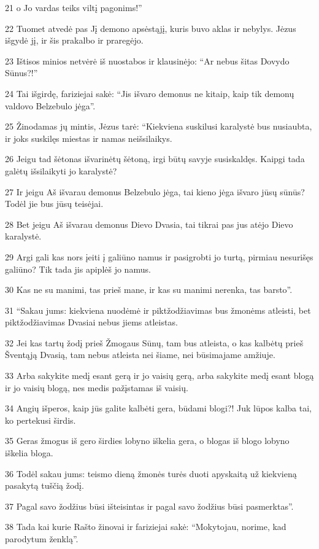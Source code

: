\par 21 o Jo vardas teiks viltį pagonims!” 
\par 22 Tuomet atvedė pas Jį demono apsėstąjį, kuris buvo aklas ir nebylys. Jėzus išgydė jį, ir šis prakalbo ir praregėjo. 
\par 23 Ištisos minios netvėrė iš nuostabos ir klausinėjo: “Ar nebus šitas Dovydo Sūnus?!” 
\par 24 Tai išgirdę, fariziejai sakė: “Jis išvaro demonus ne kitaip, kaip tik demonų valdovo Belzebulo jėga”. 
\par 25 Žinodamas jų mintis, Jėzus tarė: “Kiekviena suskilusi karalystė bus nusiaubta, ir joks suskilęs miestas ir namas neišsilaikys. 
\par 26 Jeigu tad šėtonas išvarinėtų šėtoną, irgi būtų savyje susiskaldęs. Kaipgi tada galėtų išsilaikyti jo karalystė? 
\par 27 Ir jeigu Aš išvarau demonus Belzebulo jėga, tai kieno jėga išvaro jūsų sūnūs? Todėl jie bus jūsų teisėjai. 
\par 28 Bet jeigu Aš išvarau demonus Dievo Dvasia, tai tikrai pas jus atėjo Dievo karalystė. 
\par 29 Argi gali kas nors įeiti į galiūno namus ir pasigrobti jo turtą, pirmiau nesurišęs galiūno? Tik tada jis apiplėš jo namus. 
\par 30 Kas ne su manimi, tas prieš mane, ir kas su manimi nerenka, tas barsto”. 
\par 31 “Sakau jums: kiekviena nuodėmė ir piktžodžiavimas bus žmonėms atleisti, bet piktžodžiavimas Dvasiai nebus jiems atleistas. 
\par 32 Jei kas tartų žodį prieš Žmogaus Sūnų, tam bus atleista, o kas kalbėtų prieš Šventąją Dvasią, tam nebus atleista nei šiame, nei būsimajame amžiuje. 
\par 33 Arba sakykite medį esant gerą ir jo vaisių gerą, arba sakykite medį esant blogą ir jo vaisių blogą, nes medis pažįstamas iš vaisių. 
\par 34 Angių išperos, kaip jūs galite kalbėti gera, būdami blogi?! Juk lūpos kalba tai, ko pertekusi širdis. 
\par 35 Geras žmogus iš gero širdies lobyno iškelia gera, o blogas iš blogo lobyno iškelia bloga. 
\par 36 Todėl sakau jums: teismo dieną žmonės turės duoti apyskaitą už kiekvieną pasakytą tuščią žodį. 
\par 37 Pagal savo žodžius būsi išteisintas ir pagal savo žodžius būsi pasmerktas”. 
\par 38 Tada kai kurie Rašto žinovai ir fariziejai sakė: “Mokytojau, norime, kad parodytum ženklą”. 

